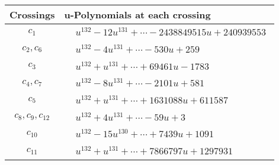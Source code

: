 \documentclass[1p]{elsarticle_modified}
\theoremstyle{definition}
\begin{document}
\begin{tabular}{m{50pt}|m{274pt}}
Crossings & \hspace{64pt}u-Polynomials at each crossing \\
\hline $$\begin{aligned}c_{1}\end{aligned}$$&$\begin{aligned}
&u^{132}-12 u^{131}+\cdots-2438849515 u+240939553
\end{aligned}$\\
\hline $$\begin{aligned}c_{2},c_{6}\end{aligned}$$&$\begin{aligned}
&u^{132}-4 u^{131}+\cdots-530 u+259
\end{aligned}$\\
\hline $$\begin{aligned}c_{3}\end{aligned}$$&$\begin{aligned}
&u^{132}+u^{131}+\cdots+69461 u-1783
\end{aligned}$\\
\hline $$\begin{aligned}c_{4},c_{7}\end{aligned}$$&$\begin{aligned}
&u^{132}-8 u^{131}+\cdots-2101 u+581
\end{aligned}$\\
\hline $$\begin{aligned}c_{5}\end{aligned}$$&$\begin{aligned}
&u^{132}+u^{131}+\cdots+1631088 u+611587
\end{aligned}$\\
\hline $$\begin{aligned}c_{8},c_{9},c_{12}\end{aligned}$$&$\begin{aligned}
&u^{132}+4 u^{131}+\cdots-59 u+3
\end{aligned}$\\
\hline $$\begin{aligned}c_{10}\end{aligned}$$&$\begin{aligned}
&u^{132}-15 u^{130}+\cdots+7439 u+1091
\end{aligned}$\\
\hline $$\begin{aligned}c_{11}\end{aligned}$$&$\begin{aligned}
&u^{132}+u^{131}+\cdots+7866797 u+1297931
\end{aligned}$\\
\hline
\end{tabular}\\~\\
\end{document}
